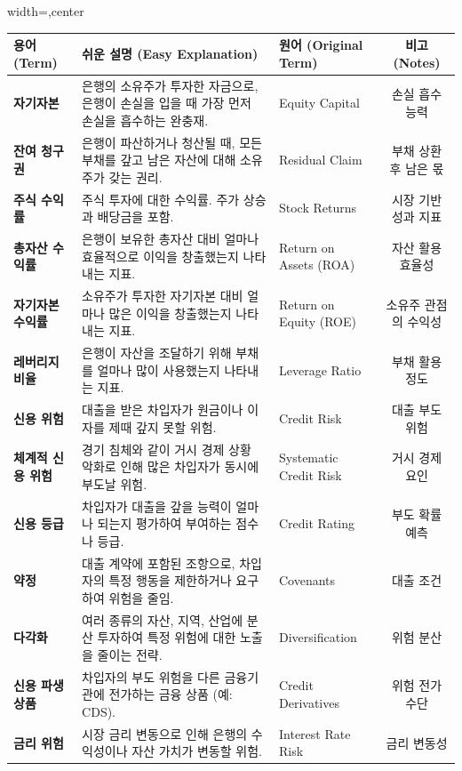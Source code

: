\documentclass[11pt,a4paper]{book}
\theoremstyle{definition}
\begin{document}
\begin{adjustbox}{width=\textwidth,center}
\begin{tabular}{lllc}
\toprule
\textbf{용어 (Term)} & \textbf{쉬운 설명 (Easy Explanation)} & \textbf{원어 (Original Term)} & \textbf{비고 (Notes)} \\
\midrule
\textbf{자기자본} & 은행의 소유주가 투자한 자금으로, 은행이 손실을 입을 때 가장 먼저 손실을 흡수하는 완충재. & Equity Capital & 손실 흡수 능력 \\
\textbf{잔여 청구권} & 은행이 파산하거나 청산될 때, 모든 부채를 갚고 남은 자산에 대해 소유주가 갖는 권리. & Residual Claim & 부채 상환 후 남은 몫 \\
\textbf{주식 수익률} & 주식 투자에 대한 수익률. 주가 상승과 배당금을 포함. & Stock Returns & 시장 기반 성과 지표 \\
\textbf{총자산 수익률} & 은행이 보유한 총자산 대비 얼마나 효율적으로 이익을 창출했는지 나타내는 지표. & Return on Assets (ROA) & 자산 활용 효율성 \\
\textbf{자기자본 수익률} & 소유주가 투자한 자기자본 대비 얼마나 많은 이익을 창출했는지 나타내는 지표. & Return on Equity (ROE) & 소유주 관점의 수익성 \\
\textbf{레버리지 비율} & 은행이 자산을 조달하기 위해 부채를 얼마나 많이 사용했는지 나타내는 지표. & Leverage Ratio & 부채 활용 정도 \\
\textbf{신용 위험} & 대출을 받은 차입자가 원금이나 이자를 제때 갚지 못할 위험. & Credit Risk & 대출 부도 위험 \\
\textbf{체계적 신용 위험} & 경기 침체와 같이 거시 경제 상황 악화로 인해 많은 차입자가 동시에 부도날 위험. & Systematic Credit Risk & 거시 경제 요인 \\
\textbf{신용 등급} & 차입자가 대출을 갚을 능력이 얼마나 되는지 평가하여 부여하는 점수나 등급. & Credit Rating & 부도 확률 예측 \\
\textbf{약정} & 대출 계약에 포함된 조항으로, 차입자의 특정 행동을 제한하거나 요구하여 위험을 줄임. & Covenants & 대출 조건 \\
\textbf{다각화} & 여러 종류의 자산, 지역, 산업에 분산 투자하여 특정 위험에 대한 노출을 줄이는 전략. & Diversification & 위험 분산 \\
\textbf{신용 파생상품} & 차입자의 부도 위험을 다른 금융기관에 전가하는 금융 상품 (예: CDS). & Credit Derivatives & 위험 전가 수단 \\
\textbf{금리 위험} & 시장 금리 변동으로 인해 은행의 수익성이나 자산 가치가 변동할 위험. & Interest Rate Risk & 금리 변동성 \\

\end{tabular}
\end{adjustbox}
\end{document}
